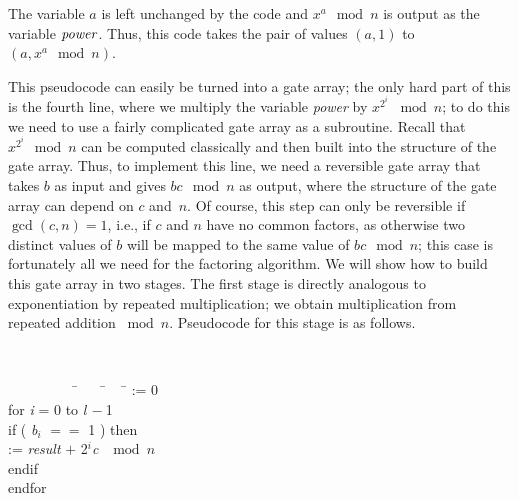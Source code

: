 \vspace{\baselineskip}

\noindent
The variable $a$ is left unchanged by the code and $x^a\mod{n}$ 
is output as the variable ${\it power}$.  Thus, this code takes
the pair of values $(a,1)$ to $(a,x^a\mod{n})$.

This pseudocode can easily be turned into a gate array;
the only hard part of this is the fourth line, where we multiply the
variable {\it power} by $x^{2^i}$ $\bmod{n}$; to do this we need to use a 
fairly complicated gate array as a subroutine.  
Recall that $x^{2^i}\mod{n}$ can be computed classically and then 
built into the 
structure of the gate array.  Thus, to implement this line, we need
a reversible gate array that takes $b$ as input and gives $bc \mod{n}$ as
output, where the structure of the gate array can depend on $c$ and~$n$.  
Of course, this step
can only be reversible if $\gcd(c,n) =1$, i.e., if
$c$ and $n$ have
no common factors, as otherwise two distinct values of $b$ will be 
mapped to the same value of $bc \mod{n}$; this case is 
fortunately all we need
for the factoring algorithm.  We will show how
to build this gate array in two stages.  The first stage is directly 
analogous to exponentiation by repeated multiplication; we obtain 
multiplication from repeated addition $\bmod{n}$.  Pseudocode for this 
stage is as follows.  

\vspace{\baselineskip}

\noindent
\begin{minipage}{\textwidth} %
{\tt
\begin{tabbing}
\ \ \ \ \ \ \ \ \ \= \ \ \ \ \= \ \ \ \ \= \kill
{} := 0\\
\tab for {\it i} = 0 to {\it l}$\,-$1\\
\tab \tab if  ( {\it b}$_i$ $==$ 1 ) then \\
\tab \tab {} := {\it result} $+$ 2$^{i}${\it c}  $\mod{n}$\\
\tab \tab endif\\
\tab endfor
\end{tabbing}
}
\end{minipage}

\vspace{\baselineskip}

